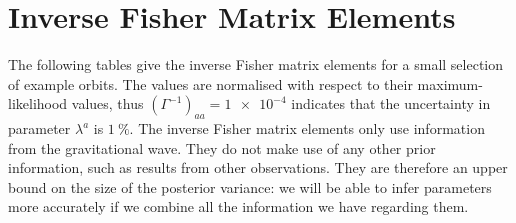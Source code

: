 \appendix

\renewcommand{\chaptername}{Appendix}

\chapter{Inverse Fisher Matrix Elements}

The following tables give the inverse Fisher matrix elements for a small selection of example orbits. The values are normalised with respect to their maximum-likelihood values, thus $(\Gamma^{-1})_{aa} = \num{1e-4}$ indicates that the uncertainty in parameter $\lambda^a$ is $\SI{1}{\percent}$. The inverse Fisher matrix elements only use information from the gravitational wave. They do not make use of any other prior information, such as results from other observations. They are therefore an upper bound on the size of the posterior variance: we will be able to infer parameters more accurately if we combine all the information we have regarding them.

